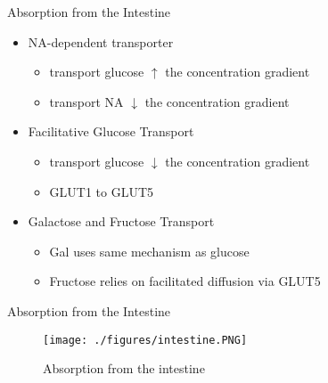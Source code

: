 \documentclass[presentation, smaller]{beamer}
\begin{document}
\begin{frame}[label={sec:org93c7fc5}]{Absorption from the Intestine}
\begin{itemize}
\item NA-dependent transporter
\begin{itemize}
\item transport glucose \(\uparrow\) the concentration gradient
\item transport NA \(\downarrow\) the concentration gradient
\end{itemize}
\item Facilitative Glucose Transport
\begin{itemize}
\item transport glucose \(\downarrow\) the concentration gradient
\item GLUT1 to GLUT5
\end{itemize}
\item Galactose and Fructose Transport
\begin{itemize}
\item Gal uses same mechanism as glucose
\item Fructose relies on facilitated diffusion via GLUT5
\end{itemize}
\end{itemize}
\end{frame}

\begin{frame}[label={sec:org62d00f9}]{Absorption from the Intestine}
\begin{figure}[htbp]
\centering
\texttt{[image: ./figures/intestine.PNG]}
\caption{\label{fig:org111b321}
Absorption from the intestine}
\end{figure}
\end{frame}
\end{document}
